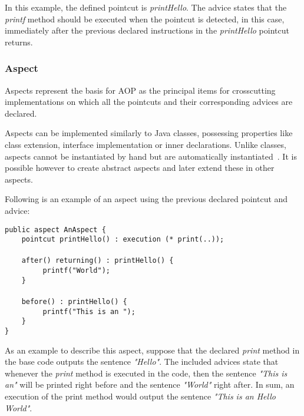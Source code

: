 \documentclass{template}
\begin{document}
In this example, the defined pointcut is \textit{printHello}. The advice states that the \textit{printf} method should be executed when the pointcut is detected, in this case, immediately after the previous declared instructions in the \textit{printHello} pointcut returns.

\subsubsection{Aspect}

Aspects represent the basis for AOP as the principal items for crosscutting implementations on which all the pointcuts and their corresponding advices are declared. 

Aspects can be implemented similarly to Java classes, possessing properties like class extension, interface implementation or inner declarations. Unlike classes, aspects cannot be instantiated by hand but are automatically instantiated~\cite{Kiselev2002}. It is possible however to create abstract aspects and later extend these in other aspects.

Following is an example of an aspect using the previous declared pointcut and advice:

\verb!public aspect AnAspect {!\\
\verb!    pointcut printHello() : execution (* print(..));!\\\\
\verb!    after() returning() : printHello() {!\\
\verb!         printf("World");!\\
\verb!    }!\\\\
\verb!    before() : printHello() {!\\
\verb!         printf("This is an ");!\\
\verb!    }!\\
\verb!}!

As an example to describe this aspect, suppose that the declared \textit{print} method in the base code outputs the sentence \textit{"Hello"}. The included advices state that whenever the \textit{print} method is executed in the code, then the sentence \textit{"This is an"} will be printed right before and the sentence \textit{"World"} right after. In sum, an execution of the print method would output the sentence \textit{"This is an Hello World"}.

\end{document}
